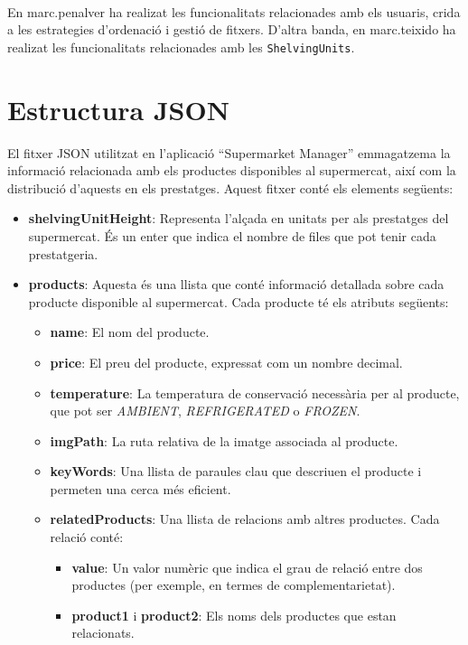 \documentclass[a4paper,12pt]{report}
\begin{document}
\begin{itemize}
\ 

En marc.penalver ha realizat les funcionalitats relacionades amb els usuaris, crida a les estrategies d'ordenació i gestió de fitxers. D'altra banda, en marc.teixido ha realizat les funcionalitats relacionades amb les \texttt{ShelvingUnits}.

\section{Estructura JSON}

El fitxer JSON utilitzat en l'aplicació ``Supermarket Manager'' emmagatzema la informació relacionada amb els productes disponibles al supermercat, així com la distribució d'aquests en els prestatges. Aquest fitxer conté els elements següents:

\begin{itemize}
	\item \textbf{shelvingUnitHeight}: Representa l'alçada en unitats per als prestatges del supermercat. És un enter que indica el nombre de files que pot tenir cada prestatgeria.

	\item \textbf{products}: Aquesta és una llista que conté informació detallada sobre cada producte disponible al supermercat. Cada producte té els atributs següents:
	      \begin{itemize}
		      \item \textbf{name}: El nom del producte.
		      \item \textbf{price}: El preu del producte, expressat com un nombre decimal.
		      \item \textbf{temperature}: La temperatura de conservació necessària per al producte, que pot ser \textit{AMBIENT}, \textit{REFRIGERATED} o \textit{FROZEN}.
		      \item \textbf{imgPath}: La ruta relativa de la imatge associada al producte.
		      \item \textbf{keyWords}: Una llista de paraules clau que descriuen el producte i permeten una cerca més eficient.
		      \item \textbf{relatedProducts}: Una llista de relacions amb altres productes. Cada relació conté:
		            \begin{itemize}
			            \item \textbf{value}: Un valor numèric que indica el grau de relació entre dos productes (per exemple, en termes de complementarietat).
			            \item \textbf{product1} i \textbf{product2}: Els noms dels productes que estan relacionats.
		            \end{itemize}
	      \end{itemize}


\end{itemize}
\end{itemize}
\end{document}
